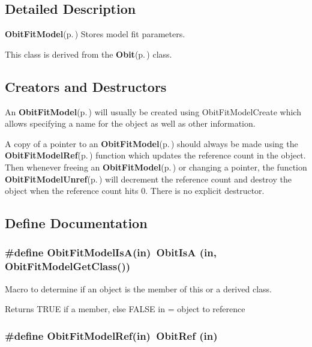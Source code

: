 

\subsection{Detailed Description}
{\bf Obit\-Fit\-Model}{\rm (p.\,\pageref{structObitFitModel})} Stores model fit parameters. 

This class is derived from the {\bf Obit}{\rm (p.\,\pageref{structObit})} class.\subsection{Creators and Destructors}\label{ObitFitModel_8h_ObitFitModelaccess}
An {\bf Obit\-Fit\-Model}{\rm (p.\,\pageref{structObitFitModel})} will usually be created using Obit\-Fit\-Model\-Create which allows specifying a name for the object as well as other information.

A copy of a pointer to an {\bf Obit\-Fit\-Model}{\rm (p.\,\pageref{structObitFitModel})} should always be made using the {\bf Obit\-Fit\-Model\-Ref}{\rm (p.\,\pageref{ObitFitModel_8h_a1})} function which updates the reference count in the object. Then whenever freeing an {\bf Obit\-Fit\-Model}{\rm (p.\,\pageref{structObitFitModel})} or changing a pointer, the function {\bf Obit\-Fit\-Model\-Unref}{\rm (p.\,\pageref{ObitFitModel_8h_a0})} will decrement the reference count and destroy the object when the reference count hits 0. There is no explicit destructor.

\subsection{Define Documentation}
\subsubsection{\setlength{\rightskip}{0pt plus 5cm}\#define Obit\-Fit\-Model\-Is\-A(in)\ Obit\-Is\-A (in, Obit\-Fit\-Model\-Get\-Class())}\label{ObitFitModel_8h_a2}


Macro to determine if an object is the member of this or a derived class. 

Returns TRUE if a member, else FALSE in = object to reference 
\subsubsection{\setlength{\rightskip}{0pt plus 5cm}\#define Obit\-Fit\-Model\-Ref(in)\ Obit\-Ref (in)}\label{ObitFitModel_8h_a1}


